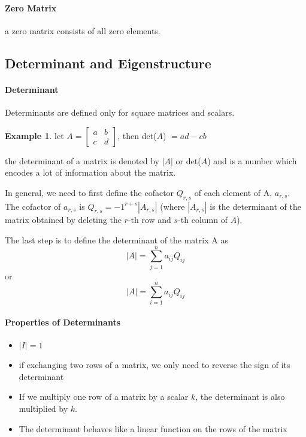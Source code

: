 \documentclass{article}
\theoremstyle{definition}
\newtheorem{example}[theorem]{Example}
\theoremstyle{remark}
\begin{document}
\paragraph{Zero Matrix}
a zero matrix consists of all zero elements.

\subsection{Determinant and Eigenstructure}

\paragraph{Determinant}
Determinants are defined only for square matrices and scalars.

\begin{example}

    let $A = \begin{bmatrix}
        a & b \\
        c & d
    \end{bmatrix}$, then 
    det($A$) $ = ad - cb$
\end{example}

the determinant of a matrix is denoted by $|A|$ or det($A$) and is a number which encodes a lot of information about the matrix.

In general, we need to first define the cofactor $Q_{r,s}$ of each element of A, $a_{r,s}$. The cofactor of $a_{r,s}$ is $Q_{r,s} = -1^{r+s} |A_{r,s}|$ (where $|A_{r,s}|$ is the determinant of the matrix obtained by deleting the $r$-th row and $s$-th column of $A$).

The last step is to define the determinant of the matrix A as $$|A| = \sum_{j=1}^{n}a_{ij}Q_{ij}$$ or $$|A| = \sum_{i=1}^na_{ij}Q_{ij}$$

\paragraph{Properties of Determinants}

\begin{itemize}
    \item $|I| = 1$
    \item if exchanging two rows of a matrix, we only need to reverse the sign of its determinant
    \item If we multiply one row of a matrix by a scalar $k$, the determinant is also multiplied by $k$. 
    \item The determinant behaves like a linear function on the rows of the matrix  
\end{itemize}
\end{document}
